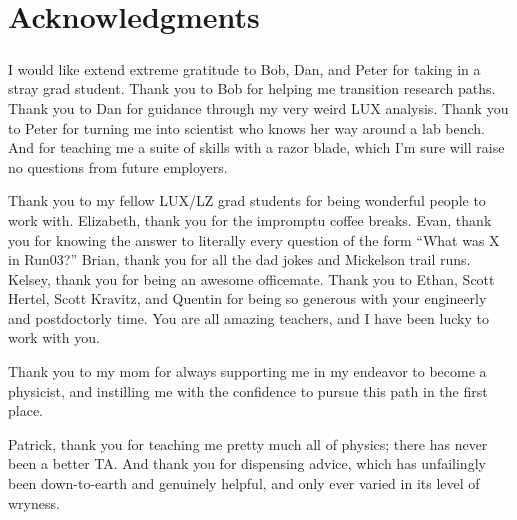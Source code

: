 

\bigskip


\begingroup

\let\clearpage\relax
\let\cleardoublepage\relax
\let\cleardoublepage\relax

\chapter*{Acknowledgments}

\paragraph{} I would like extend extreme gratitude to Bob, Dan, and Peter for taking in a stray grad student. Thank you to Bob for helping me transition research paths. Thank you to Dan for guidance through my very weird LUX analysis. Thank you to Peter for turning me into scientist who knows her way around a lab bench. And for teaching me a suite of skills with a razor blade, which I'm sure will raise no questions from future employers. %

Thank you to my fellow LUX/LZ grad students for being wonderful people to work with. Elizabeth, thank you for the impromptu coffee breaks. Evan, thank you for knowing the answer to literally every question of the form ``What was X in Run03?''  Brian, thank you for all the dad jokes and Mickelson trail runs. Kelsey, thank you for being an awesome officemate. Thank you to Ethan, Scott Hertel, Scott Kravitz, and Quentin for being so generous with your engineerly and postdoctorly time. You are all amazing teachers, and I have been lucky to work with you.     %

Thank you to my mom for always supporting me in my endeavor to become a physicist, and instilling me with the confidence to pursue this path in the first place. %

Patrick, thank you for teaching me pretty much all of physics; there has never been a better TA. And thank you for dispensing advice, which has unfailingly been down-to-earth and genuinely helpful, and only ever varied in its level of wryness.

